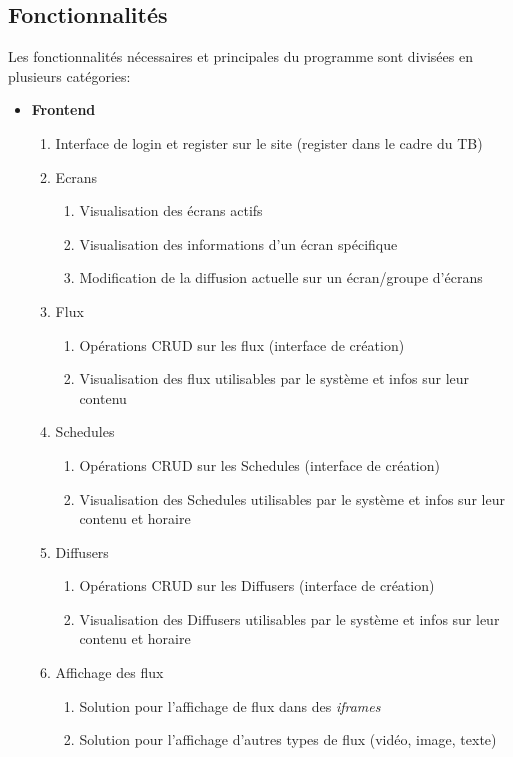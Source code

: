 \documentclass[french]{article}
\begin{document}
\begin{appendices}
\subsection{Fonctionnalités}
Les fonctionnalités nécessaires et principales du programme sont divisées en plusieurs catégories:
\begin{itemize}
	\item \textbf{Frontend}
	\begin{enumerate}
		\item Interface de login et register sur le site (register dans le cadre du TB)
		\item Ecrans
		\begin{enumerate}
			\item Visualisation des écrans actifs
			\item Visualisation des informations d'un écran spécifique 
			\item Modification de la diffusion actuelle sur un écran/groupe d'écrans 
		\end{enumerate}
		\item Flux
		\begin{enumerate}
			\item Opérations CRUD sur les flux (interface de création)
			\item Visualisation des flux utilisables par le système et infos sur leur contenu
		\end{enumerate}
		\item Schedules
		\begin{enumerate}
			\item Opérations CRUD sur les Schedules (interface de création)
			\item Visualisation des Schedules utilisables par le système et infos sur leur contenu et horaire
		\end{enumerate}
		\item Diffusers
		\begin{enumerate}
			\item Opérations CRUD sur les Diffusers (interface de création)
			\item Visualisation des Diffusers utilisables par le système et infos sur leur contenu et horaire
		\end{enumerate}
		\item Affichage des flux
		\begin{enumerate}
			\item Solution pour l'affichage de flux dans des \textit{iframes}
			\item Solution pour l'affichage d'autres types de flux (vidéo, image, texte)

\end{enumerate}
\end{enumerate}
\end{itemize}
\end{appendices}
\end{document}

